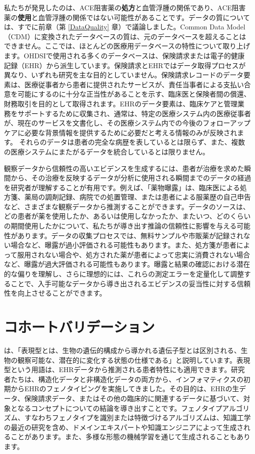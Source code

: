 \documentclass[
  11pt]{book}
\theoremstyle{definition}
\theoremstyle{definition}
\theoremstyle{definition}
\theoremstyle{definition}
\theoremstyle{remark}
\begin{document}
私たちが発見したのは、ACE阻害薬の\textbf{処方}と血管浮腫の関係であり、ACE阻害薬の\textbf{使用}と血管浮腫の関係ではない可能性があることです。データの質については、すでに前章（第 \ref{DataQuality} 章）で議論しました。Common Data Model（CDM）に変換されたデータベースの質は、元のデータベースを超えることはできません。ここでは、ほとんどの医療用データベースの特性について取り上げます。OHDSIで使用される多くのデータベースは、保険請求または電子的健康記録（EHR）から派生しています。保険請求とEHRではデータ取得プロセスが異なり、いずれも研究を主な目的としていません。保険請求レコードのデータ要素は、医療従事者から患者に提供されたサービスが、責任当事者による支払い合意を可能にするのに十分な正当性があることを示す、臨床医と保険者間の償還、財務取引を目的として取得されます。EHRのデータ要素は、臨床ケアと管理業務をサポートするために収集され、通常は、特定の医療システム内の医療従事者が、現在のサービスを文書化し、その医療システム内での今後のフォローアップケアに必要な背景情報を提供するために必要だと考える情報のみが反映されます。 それらのデータは患者の完全な病歴を表しているとは限らず、また、複数の医療システムにまたがるデータを統合しているとは限りません。

観察データから信頼性の高いエビデンスを生成するには、患者が治療を求めた瞬間から、その治療を反映するデータが分析に使用される瞬間までのデータの経過を研究者が理解することが有用です。例えば、「薬物曝露」は、臨床医による処方箋、薬局の調剤記録、病院での処置管理、または患者による服薬歴の自己申告など、さまざまな観察データから推測することができます。データのソースは、どの患者が薬を使用したか、あるいは使用しなかったか、またいつ、どのくらいの期間使用したかについて、私たちが導き出す推論の信頼性に影響を与える可能性があります。データの収集プロセスでは、無料サンプルや市販薬が記録されない場合など、曝露が過小評価される可能性もあります。また、処方箋が患者によって服用されない場合や、処方された薬が患者によって忠実に消費されない場合など、曝露が過大評価される可能性もあります。曝露と結果の確認における潜在的な偏りを理解し、さらに理想的には、これらの測定エラーを定量化して調整することで、入手可能なデータから導き出されるエビデンスの妥当性に対する信頼性を向上させることができます。

\section{コホートバリデーション}\label{CohortValidation}

\citet{hripcsak_2017} は、「表現型とは、生物の遺伝的構成から導かれる遺伝子型とは区別される、生物の観察可能な、潜在的に変化する状態の仕様である」と説明しています。表現型という用語は、EHRデータから推測される患者特性にも適用できます。研究者たちは、構造化データと非構造化データの両方から、インフォマティクスの初期からEHRのフェノタイピングを実施してきました。その目的は、EHRの生データ、保険請求データ、またはその他の臨床的に関連するデータに基づいて、対象となるコンセプトについての結論を導き出すことです。フェノタイプアルゴリズム、すなわちフェノタイプを識別または特徴づけるアルゴリズムは、知識工学の最近の研究を含め、ドメインエキスパートや知識エンジニアによって生成されることがあります。また、多様な形態の機械学習を通じて生成されることもあります。
\end{document}
